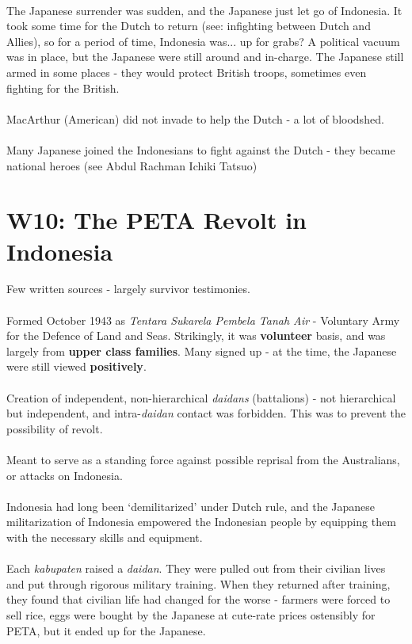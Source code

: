 \documentclass[a4paper]{article}
\begin{document}
\\
The Japanese surrender was sudden, and the Japanese just let go of Indonesia. It took some time for the Dutch to return (see: infighting between Dutch and Allies), so for a period of time, Indonesia was... up for grabs? A political vacuum was in place, but the Japanese were still around and in-charge. The Japanese still armed in some places - they would protect British troops, sometimes even fighting for the British.\\
\\
MacArthur (American) did not invade to help the Dutch - a lot of bloodshed.\\
\\
Many Japanese joined the Indonesians to fight against the Dutch - they became national heroes (see Abdul Rachman Ichiki Tatsuo)
\section{W10: The PETA Revolt in Indonesia}
Few written sources - largely survivor testimonies.\\
\\
Formed October 1943 as \textit{Tentara Sukarela Pembela Tanah Air} - Voluntary Army for the Defence of Land and Seas. Strikingly, it was \textbf{volunteer} basis, and was largely from \textbf{upper class families}. Many signed up - at the time, the Japanese were still viewed \textbf{positively}.\\
\\
Creation of independent, non-hierarchical \textit{daidans} (battalions) - not hierarchical but independent, and intra-\textit{daidan} contact was forbidden. This was to prevent the possibility of revolt.\\
\\
Meant to serve as a standing force against possible reprisal from the Australians, or attacks on Indonesia.\\
\\
Indonesia had long been `demilitarized' under Dutch rule, and the Japanese militarization of Indonesia empowered the Indonesian people by equipping them with the necessary skills and equipment.\\
\\
Each \textit{kabupaten} raised a \textit{daidan}. They were pulled out from their civilian lives and put through rigorous military training. When they returned after training, they found that civilian life had changed for the worse - farmers were forced to sell rice, eggs were bought by the Japanese at cute-rate prices ostensibly for PETA, but it ended up for the Japanese.\\
\end{document}
